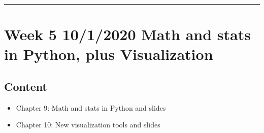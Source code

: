 \documentclass[letterpaper,10pt,english]{sphinxmanual}
\begin{document}
\bigskip\hrule\bigskip



\section{Week 5 \sphinxhyphen{} 10/1/2020 \sphinxhyphen{} Math and stats in Python, plus Visualization}
\label{\detokenize{course-schedule:week-5-10-1-2020-math-and-stats-in-python-plus-visualization}}

\subsection{Content}
\label{\detokenize{course-schedule:id7}}\begin{itemize}
\item {} 
Chapter 9: Math and stats in Python \sphinxhyphen{} {\hyperref[\detokenize{chapter-9-math-and-stats::doc}]{}} and slides

\item {} 
Chapter 10: New visualization tools \sphinxhyphen{} {\hyperref[\detokenize{chapter-10-visualization::doc}]{}} and slides

\end{itemize}
\end{document}
